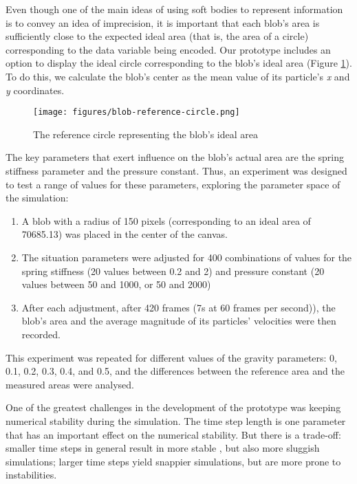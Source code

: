 \documentclass[manuscript, screen]{timtm}
\begin{document}
Even though one of the main ideas of using soft bodies to represent information is to convey an idea of imprecision, it is important that each blob's area is sufficiently close to the expected ideal area (that is, the area of a circle) corresponding to the data variable being encoded. Our prototype includes an option to display the ideal circle corresponding to the blob's ideal area (Figure \ref{fig:blob-reference-circle}). To do this, we calculate the blob's center as the mean value of its particle's \textit{x} and \textit{y} coordinates.

\begin{figure}[h]
  \centering
  \texttt{[image: figures/blob-reference-circle.png]}
  \caption{The reference circle representing the blob's ideal area}
  \label{fig:blob-reference-circle}
\end{figure}

The key parameters that exert influence on the blob's actual area are the spring stiffness parameter and the pressure constant. Thus, an experiment was designed to test a range of values for these parameters, exploring the parameter space of the simulation:

\begin{enumerate}
    \item A blob with a radius of 150 pixels (corresponding to an ideal area of 70685.13) was placed in the center of the canvas.
    \item The situation parameters were adjusted for 400 combinations of values for the spring stiffness (20 values between 0.2 and 2) and pressure constant (20 values between 50 and 1000, or 50 and 2000)
    \item After each adjustment, after 420 frames (7s at 60 frames per second)), the blob's area and the average magnitude of its particles' velocities were then recorded.
\end{enumerate}

This experiment was repeated for different values of the gravity parameters: 0, 0.1, 0.2, 0.3, 0.4, and 0.5, and the differences between the reference area and the measured areas were analysed.

One of the greatest challenges in the development of the prototype was keeping numerical stability during the simulation. The time step length is one parameter that has an important effect on the numerical stability. But there is a trade-off: smaller time steps in general result in more stable , but also more sluggish simulations; larger time steps yield snappier simulations, but are more prone to instabilities.
\end{document}
